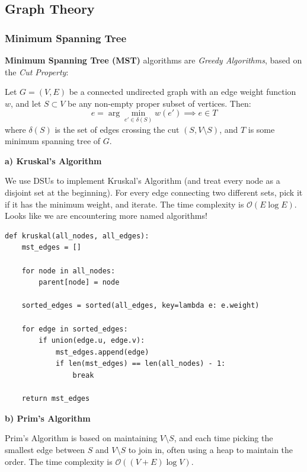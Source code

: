 \documentclass{article}
\begin{document}
\subsection{Graph Theory}

\subsubsection{Minimum Spanning Tree}

\textbf{Minimum Spanning Tree (MST)} algorithms are \emph{Greedy Algorithms}, based on the \emph{Cut Property}:

\begin{mdquote}
Let $G = (V, E)$ be a connected undirected graph with an edge weight function $w$, and let $S \subset V$ be any non-empty proper subset of vertices. Then:$$e = \arg\min_{e' \in \delta(S)} w(e') \implies e \in T$$where $\delta(S)$ is the set of edges crossing the cut $(S, V \setminus S)$, and $T$ is some minimum spanning tree of $G$.
\end{mdquote}

\textbf{a) Kruskal's Algorithm}

We use DSUs to implement Kruskal's Algorithm (and treat every node as a disjoint set at the beginning). For every edge connecting two different sets, pick it if it has the minimum weight, and iterate. The time complexity is $\mathcal O(E\log E)$. Looks like we are encountering more named algorithms!

\begin{lstlisting}[style=python]
def kruskal(all_nodes, all_edges):
    mst_edges = []
    
    for node in all_nodes:
        parent[node] = node
        
    sorted_edges = sorted(all_edges, key=lambda e: e.weight)
    
    for edge in sorted_edges:
        if union(edge.u, edge.v):
            mst_edges.append(edge)
            if len(mst_edges) == len(all_nodes) - 1:
                break
    
    return mst_edges
\end{lstlisting}


\textbf{b) Prim's Algorithm}

Prim's Algorithm is based on maintaining $V\setminus S$, and each time picking the smallest edge between $S$ and $V\setminus S$ to join in, often using a heap to maintain the order. The time complexity is $\mathcal O((V+E)\log V)$.
\end{document}
